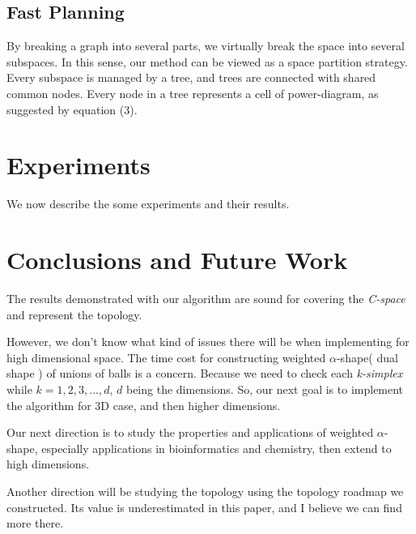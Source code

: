 \documentclass[11pt]{article}
\begin{document}
  \subsection{Fast Planning}
  \indent\indent By breaking a graph into several parts, we virtually break the space into several subspaces. In this sense, our method can be viewed as a space partition strategy. Every subspace is managed by a tree, and trees are connected with shared common nodes. Every node in a tree represents a cell of power-diagram, as suggested by equation (3).
  
  \indent 
  

%
\section{Experiments}\label{experiments}
We now describe the some experiments and their results.

%
\section{Conclusions and Future Work}\label{conclusions}
\indent\indent The results demonstrated with our algorithm are sound for covering the \emph{C-space} and represent the topology.  

\indent However, we don't know what kind of issues there will be when implementing for high dimensional space. The time cost for constructing weighted $\alpha$-shape( dual shape ) of unions of balls is a concern. Because we need to check each \emph{k-simplex} while $k = 1, 2, 3, ..., d$, $d$ being the dimensions. So, our next goal is to implement the algorithm for 3D case, and then higher dimensions.

\indent Our next direction is to study the properties and applications of weighted $\alpha$-shape, especially applications in bioinformatics and chemistry, then extend to high dimensions.

\indent Another direction will be studying the topology using the topology roadmap we constructed. Its value is underestimated in this paper, and I believe we can find more there.
\end{document}
